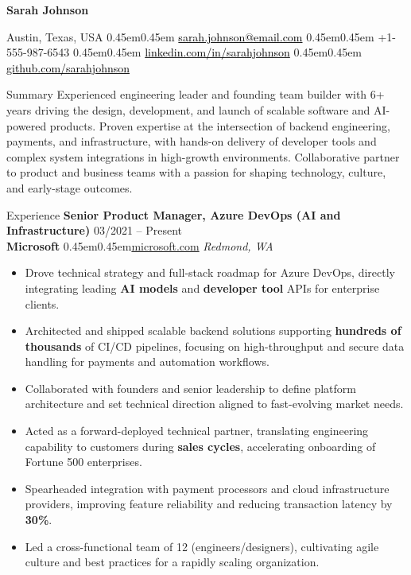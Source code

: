 \documentclass[10pt, letterpaper]{article}
\makeatletter
\renewcommand{\section}{%
  \@startsection{section}{1}{\z@}{10pt}{6pt}{%
    \Large\bfseries\color{black}%
  }%
}
\newcommand{\bull}{\kern0.45em\textbullet\kern0.45em}
\newcommand{\role}[1]{\textbf{#1}}
\newcommand{\org}[1]{\textbf{#1}}
\newcommand{\place}[1]{\textit{#1}}
\newcommand{\blackLink}[2]{\href{#1}{\textcolor{black}{#2}}}
\renewcommand{\maketitle}{
  \begin{center}
    {\huge\bfseries Sarah Johnson}\par\vspace{6pt}
    {\color{Primary}
      Austin, Texas, USA \bull
      \blackLink{mailto:sarah.johnson@email.com}{sarah.johnson@email.com} \bull
      +1-555-987-6543 \bull
      \blackLink{https://linkedin.com/in/sarahjohnson}{linkedin.com/in/sarahjohnson} \bull
      \blackLink{https://github.com/sarahjohnson}{github.com/sarahjohnson}
    }
  \end{center}
  \vspace{-8pt}
}
\makeatother
\begin{document}
\maketitle
\vspace{15pt}

\section{Summary}
Experienced engineering leader and founding team builder with 6+ years driving the design, development, and launch of scalable software and AI-powered products. Proven expertise at the intersection of backend engineering, payments, and infrastructure, with hands-on delivery of developer tools and complex system integrations in high-growth environments. Collaborative partner to product and business teams with a passion for shaping technology, culture, and early-stage outcomes.

\section{Experience}
\role{Senior Product Manager, Azure DevOps (AI and Infrastructure)} \hfill 03/2021 -- Present \\
\org{Microsoft} \bull \href{https://microsoft.com}{microsoft.com} \hfill \place{Redmond, WA}
\begin{itemize}
  \item Drove technical strategy and full-stack roadmap for Azure DevOps, directly integrating leading \textbf{AI models} and \textbf{developer tool} APIs for enterprise clients.
  \item Architected and shipped scalable backend solutions supporting \textbf{hundreds of thousands} of CI/CD pipelines, focusing on high-throughput and secure data handling for payments and automation workflows.
  \item Collaborated with founders and senior leadership to define platform architecture and set technical direction aligned to fast-evolving market needs.
  \item Acted as a forward-deployed technical partner, translating engineering capability to customers during \textbf{sales cycles}, accelerating onboarding of Fortune 500 enterprises.
  \item Spearheaded integration with payment processors and cloud infrastructure providers, improving feature reliability and reducing transaction latency by \textbf{30\%}.
  \item Led a cross-functional team of 12 (engineers/designers), cultivating agile culture and best practices for a rapidly scaling organization.
\end{itemize}
\vspace{12pt}
\end{document}
